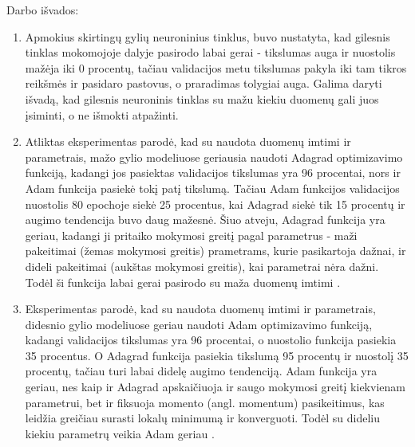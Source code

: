 \documentclass{VUMIFPSkursinis}
\begin{document}
Darbo išvados:
\begin{enumerate}
\item Apmokius skirtingų gylių neuroninius tinklus, buvo nustatyta, kad gilesnis tinklas mokomojoje dalyje pasirodo labai gerai - tikslumas auga ir nuostolis mažėja iki 0 procentų, tačiau 
validacijos metu tikslumas pakyla iki tam tikros reikšmės ir pasidaro pastovus, o praradimas tolygiai auga. Galima daryti išvadą, kad gilesnis neuroninis tinklas su mažu kiekiu duomenų gali juos 
įsiminti, o ne išmokti atpažinti.
\item Atliktas eksperimentas parodė, kad su naudota duomenų imtimi ir parametrais, mažo gylio modeliuose geriausia naudoti Adagrad optimizavimo funkciją, kadangi jos pasiektas validacijos tikslumas yra 96 procentai, nors ir Adam funkcija pasiekė tokį 
patį tikslumą. Tačiau Adam funkcijos validacijos nuostolis 80 epochoje siekė 25 procentus, kai Adagrad siekė tik 15 procentų ir augimo tendencija buvo daug mažesnė. Šiuo atveju, Adagrad funkcija yra geriau, kadangi ji pritaiko mokymosi greitį pagal 
parametrus - maži pakeitimai (žemas mokymosi greitis) prametrams, kurie pasikartoja dažnai, ir dideli pakeitimai (aukštas mokymosi greitis), kai parametrai nėra dažni. Todėl ši funkcija labai gerai pasirodo su maža duomenų imtimi \cite{2016arXiv161106652K}.
\item Eksperimentas parodė, kad su naudota duomenų imtimi ir parametrais, didesnio gylio modeliuose geriau naudoti Adam optimizavimo funkciją, kadangi validacijos tikslumas yra 96 procentai, o nuostolio funkcija pasiekia 35 procentus. O Adagrad 
funkcija pasiekia tikslumą 95 procentų ir nuostolį 35 procentų, tačiau turi labai didelę augimo tendenciją. Adam funkcija yra geriau, nes kaip ir Adagrad apskaičiuoja ir saugo mokymosi greitį kiekvienam parametrui, bet ir fiksuoja momento (angl. 
momentum) pasikeitimus, kas leidžia greičiau surasti lokalų minimumą ir konverguoti. Todėl su dideliu kiekiu parametrų veikia Adam geriau \cite{DBLP:journals/corr/KingmaB14}.
\end{enumerate}

\printbibliography[heading=bibintoc] 
\end{document}
